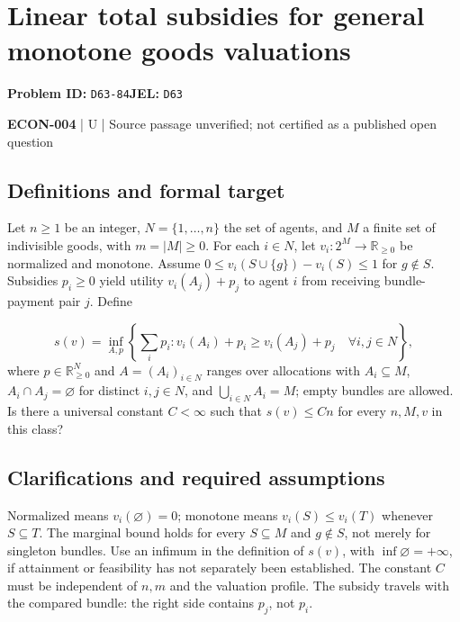 \documentclass[11pt,a4paper]{article}
\begin{document}
\section*{Linear total subsidies for general monotone goods valuations}
\textbf{Problem ID:} \texttt{D63-84}\quad \textbf{JEL:} \texttt{D63}\par
\label{problem:OP-0591}


\label{audited:ECON-004}

{\sffamily\small\color{muted}\textbf{ECON-004} | U | Source passage unverified; not certified as a published open question\par}

\subsection*{Definitions and formal target}

Let $n\geq1$ be an integer, $N=\{1,\ldots,n\}$ the set of agents, and $M$ a finite set of indivisible goods, with $m=|M|\geq0$. For each $i\in N$, let $v_i:2^M\to\mathbb R_{\geq0}$ be normalized and monotone. Assume $0\leq v_i(S\cup\{g\})-v_i(S)\leq1$ for $g\notin S$. Subsidies $p_i\geq0$ yield utility $v_i(A_j)+p_j$ to agent $i$ from receiving bundle-payment pair $j$. Define

\[
 s(v)=\inf_{A,p}\left\{\sum_i p_i:
 v_i(A_i)+p_i\geq v_i(A_j)+p_j\quad\forall i,j\in N\right\},
\]
where $p\in\mathbb R_{\geq0}^{N}$ and $A=(A_i)_{i\in N}$ ranges over allocations with $A_i\subseteq M$, $A_i\cap A_j=\varnothing$ for distinct $i,j\in N$, and $\bigcup_{i\in N}A_i=M$; empty bundles are allowed. Is there a universal constant $C<\infty$ such that $s(v)\leq Cn$ for every $n,M,v$ in this class?

\subsection*{Clarifications and required assumptions}

Normalized means $v_i(\varnothing)=0$; monotone means $v_i(S)\leq v_i(T)$ whenever $S\subseteq T$. The marginal bound holds for every $S\subseteq M$ and $g\notin S$, not merely for singleton bundles. Use an infimum in the definition of $s(v)$, with $\inf\varnothing=+\infty$, if attainment or feasibility has not separately been established. The constant $C$ must be independent of $n,m$ and the valuation profile. The subsidy travels with the compared bundle: the right side contains $p_j$, not $p_i$.
\end{document}
